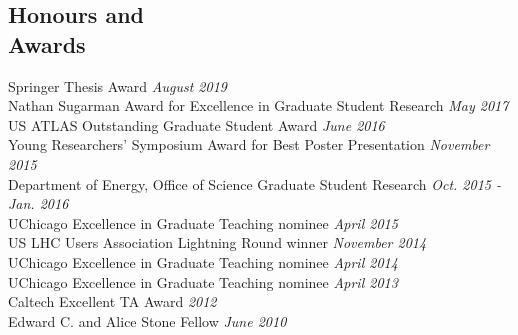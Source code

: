 \documentclass[margin,line]{resume}
\let\origsection\section%
\let\section\subsection%
\let\section\origsection%
\begin{document}
\begin{resume}
\section{\mysidestyle Honours and\\Awards}

Springer Thesis Award \hfill \textsl{August 2019}\\
Nathan Sugarman Award for Excellence in Graduate Student Research \hfill \textsl{May 2017}\\
US ATLAS Outstanding Graduate Student Award \hfill \textsl{June 2016}\\
Young Researchers' Symposium Award for Best Poster Presentation \hfill \textsl{November 2015}\\
Department of Energy, Office of Science Graduate Student Research \hfill \textsl{Oct. 2015 - Jan. 2016}\\
UChicago Excellence in Graduate Teaching nominee \hfill \textsl{April 2015}\\
US LHC Users Association Lightning Round winner \hfill \textsl{November 2014}\\
UChicago Excellence in Graduate Teaching nominee \hfill \textsl{April 2014}\\
UChicago Excellence in Graduate Teaching nominee \hfill \textsl{April 2013}\\
Caltech Excellent TA Award \hfill \textsl{2012}\\
Edward C. and Alice Stone Fellow \hfill \textsl{June 2010}

\end{resume}
\end{document}
